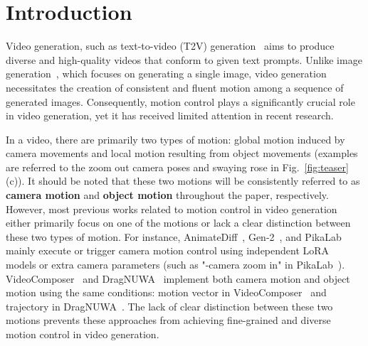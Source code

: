 \documentclass[sigconf]{acmart}
\begin{document}
\maketitle

\section{Introduction}
Video generation, such as text-to-video (T2V) generation~\cite{ho2022imagen,singer2022make,zhou2022magicvideo,he2022lvdm,blattmann2023align,chen2023videocrafter1} aims to produce diverse and high-quality videos that conform to given text prompts. Unlike image generation~\cite{t2i1, t2i2, t2i3, t2i4, t2i5, ldm}, which focuses on generating a single image, video generation necessitates the creation of consistent and fluent motion among a sequence of generated images. Consequently, motion control plays a significantly crucial role in video generation, yet it has received limited attention in recent research.

In a video, there are primarily two types of motion: global motion induced by camera movements and local motion resulting from object movements (examples are referred to the zoom out camera poses and swaying rose in Fig.~\ref{fig:teaser} (c)). It should be noted that these two motions will be consistently referred to as \textbf{camera motion} and \textbf{object motion} throughout the paper, respectively. However, most previous works related to motion control in video generation either primarily focus on one of the motions or lack a clear distinction between these two types of motion. For instance, AnimateDiff~\cite{guo2023animatediff}, Gen-2~\cite{esser2023structure}, and PikaLab~\cite{pikalab} mainly execute or trigger camera motion control using independent LoRA~\cite{lora} models or extra camera parameters (such as "-camera zoom in" in PikaLab~\cite{pikalab}). VideoComposer~\cite{wang2023videocomposer} and DragNUWA~\cite{yin2023dragnuwa} implement both camera motion and object motion using the same conditions: motion vector in VideoComposer~\cite{wang2023videocomposer} and trajectory in DragNUWA~\cite{yin2023dragnuwa}. The lack of clear distinction between these two motions prevents these approaches from achieving fine-grained and diverse motion control in video generation.
\end{document}
